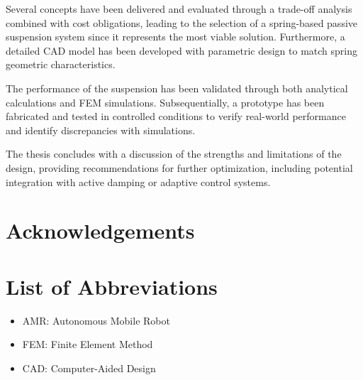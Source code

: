 \documentclass[11pt]{article}
\begin{document}
Several concepts have been delivered and evaluated through a trade-off analysis combined with cost obligations, leading to the selection of a spring-based passive suspension system since it represents the most viable solution. Furthermore, a detailed CAD model has been developed with parametric design to match spring geometric characteristics.

The performance of the suspension has been validated through both analytical calculations and FEM simulations. Subsequentially, a prototype has been fabricated and tested in controlled conditions to verify real-world performance and identify discrepancies with simulations.

The thesis concludes with a discussion of the strengths and limitations of the design, providing recommendations for further optimization, including potential integration with active damping or adaptive control systems.


\newpage
\thispagestyle{empty}

\section*{Acknowledgements}

\newpage
\thispagestyle{empty}
\tableofcontents

\newpage
\thispagestyle{empty}
\listoffigures

\newpage
\thispagestyle{empty}
\listoftables

\newpage
\thispagestyle{empty}
\section*{List of Abbreviations}
\begin{itemize}
    \item AMR: Autonomous Mobile Robot
    \item FEM: Finite Element Method
    \item CAD: Computer-Aided Design
\end{itemize}
\end{document}
